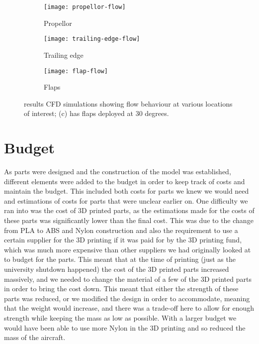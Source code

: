 \documentclass[../../main.tex]{subfiles}
\begin{document}
\begin{figure}[H]

    \centering
    \begin{subfigure}[b]{0.49\columnwidth}
        \centering
        \texttt{[image: propellor-flow]}
        \caption{Propellor}
        \label{fig:flow-behaviour:propellor}
    \end{subfigure}
    \hfill
    \begin{subfigure}[b]{0.49\columnwidth}
        \centering
        \texttt{[image: trailing-edge-flow]}
        \caption{Trailing edge}
        \label{fig:flow-behaviour:trailing-edge}
    \end{subfigure}

    \begin{subfigure}[b]{0.49\columnwidth}
        \centering
        \texttt{[image: flap-flow]}
        \caption{Flaps}
        \label{fig:flow-behaviour:flaps}
    \end{subfigure}
    
    \caption{results CFD simulations showing flow behaviour at various locations of interest; (c) has flaps deployed at 30 degrees.}
    \label{fig:flow-behaviour}
\end{figure} 

\section{Budget} \label{sec:project-review:budget}

As parts were designed and the construction of the model was established, different elements were added to the budget in order to keep track of costs and maintain the budget.
This included both costs for parts we knew we would need and estimations of costs for parts that were unclear earlier on.
One difficulty we ran into was the cost of 3D printed parts, as the estimations made for the costs of these parts was significantly lower than the final cost.
This was due to the change from PLA to ABS and Nylon construction and also the requirement to use a certain supplier for the 3D printing if it was paid for by the 3D printing fund, which was much more expensive than other suppliers we had originally looked at to budget for the parts.
This meant that at the time of printing (just as the university shutdown happened) the cost  of the 3D printed parts increased massively, and we needed to change the material of a few of the 3D printed parts in order to bring the cost down.
This meant that either the strength of these parts was reduced, or we modified the design in order to accommodate, meaning that the weight would increase, and there was a trade-off here to allow for enough strength while keeping the mass as low as possible.
With a larger budget we would have been able to use more Nylon in the 3D printing and so reduced the mass of the aircraft. 
\end{document}

